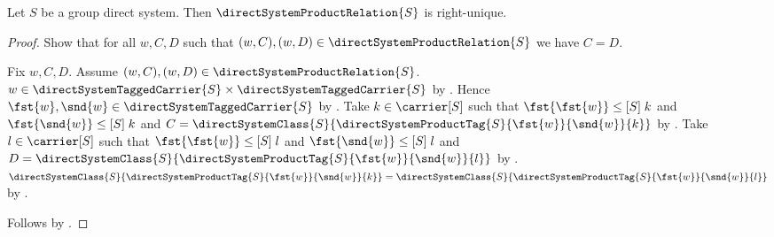 \begin{lemma}\label{direct_system_product_relation_right_unique}
    Let $S$ be a group direct system.
    Then $\directSystemProductRelation{S}$ is right-unique.
\end{lemma}
\begin{proof}
    Show that for all $w,C,D$ such that
        $(w,C),(w,D)\in\directSystemProductRelation{S}$ we have
        $C=D$.
    \begin{subproof}
        Fix $w,C,D$.
        Assume $(w,C),(w,D)\in\directSystemProductRelation{S}$.
        $w\in\directSystemTaggedCarrier{S}\times
            \directSystemTaggedCarrier{S}$ by
            .
        Hence $\fst{w},\snd{w}\in
            \directSystemTaggedCarrier{S}$ by
            .
        Take $k\in\carrier[S]$ such that
            $\fst{\fst{w}}\mathrel{\leq[S]}k$ and
            $\fst{\snd{w}}\mathrel{\leq[S]}k$ and
            $C=\directSystemClass{S}
                {\directSystemProductTag{S}{\fst{w}}{\snd{w}}{k}}$ by
            .
        Take $l\in\carrier[S]$ such that
            $\fst{\fst{w}}\mathrel{\leq[S]}l$ and
            $\fst{\snd{w}}\mathrel{\leq[S]}l$ and
            $D=\directSystemClass{S}
                {\directSystemProductTag{S}{\fst{w}}{\snd{w}}{l}}$ by
            .
        $\directSystemClass{S}
                {\directSystemProductTag{S}{\fst{w}}{\snd{w}}{k}}
            =\directSystemClass{S}
                {\directSystemProductTag{S}{\fst{w}}{\snd{w}}{l}}$ by
            .
    \end{subproof}
    Follows by .
\end{proof}

